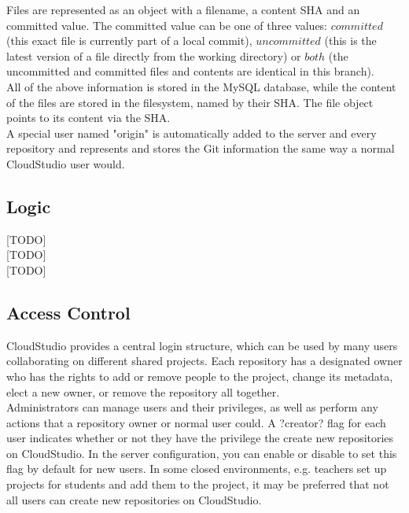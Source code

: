 Files are represented as an object with a filename, a content SHA and an committed value. The committed value can be one of three values: $committed$ (this exact file is currently part of a local commit), $uncommitted$ (this is the latest version of a file directly from the working directory) or $both$ (the uncommitted and committed files and contents are identical in this branch). \\

All of the above information is stored in the MySQL database, while the content of the files are stored in the filesystem, named by their SHA. The file object points to its content via the SHA. \\

A special user named "origin" is automatically added to the server and every repository and represents and stores the Git information the same way a normal CloudStudio user would.

\subsection{Logic}

[TODO] \\

[TODO] \\

[TODO]

\subsection{Access Control}

CloudStudio provides a central login structure, which can be used by many users collaborating on different shared projects. Each repository has a designated owner who has the rights to add or remove people to the project, change its metadata, elect a new owner, or remove the repository all together. \\

Administrators can manage users and their privileges, as well as perform any actions that a repository owner or normal user could. A ?creator? flag for each user indicates whether or not they have the privilege the create new repositories on CloudStudio. In the server configuration, you can enable or disable to set this flag by default for new users. In some closed environments, e.g. teachers set up projects for students and add them to the project, it may be preferred that not all users can create new repositories on CloudStudio.


